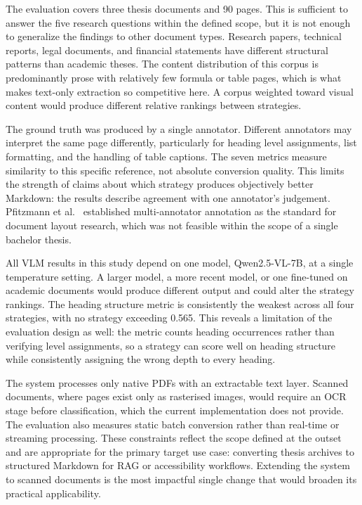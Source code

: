 The evaluation covers three thesis documents and 90 pages. This is sufficient to
answer the five research questions within the defined scope, but it is not enough
to generalize the findings to other document types. Research papers, technical
reports, legal documents, and financial statements have different structural
patterns than academic theses. The content distribution of this corpus is
predominantly prose with relatively few formula or table pages, which is what
makes text-only extraction so competitive here. A corpus weighted toward visual
content would produce different relative rankings between strategies.

The ground truth was produced by a single annotator. Different annotators may
interpret the same page differently, particularly for heading level assignments,
list formatting, and the handling of table captions. The seven metrics measure
similarity to this specific reference, not absolute conversion quality. This
limits the strength of claims about which strategy produces objectively better
Markdown: the results describe agreement with one annotator's judgement.
Pfitzmann et al.\ \autocite{pfitzmann2022} established multi-annotator annotation
as the standard for document layout research, which was not feasible within the
scope of a single bachelor thesis.

All VLM results in this study depend on one model, Qwen2.5-VL-7B, at a single
temperature setting. A larger model, a more recent model, or one fine-tuned on
academic documents would produce different output and could alter the strategy
rankings. The heading structure metric is consistently the weakest across all four
strategies, with no strategy exceeding 0.565. This reveals a limitation of the
evaluation design as well: the metric counts heading occurrences rather than
verifying level assignments, so a strategy can score well on heading structure
while consistently assigning the wrong depth to every heading.

The system processes only native PDFs with an extractable text layer. Scanned
documents, where pages exist only as rasterised images, would require an OCR
stage before classification, which the current implementation does not provide.
The evaluation also measures static batch conversion rather than real-time or
streaming processing. These constraints reflect the scope defined at the outset
and are appropriate for the primary target use case: converting thesis archives to
structured Markdown for RAG or accessibility workflows. Extending the system to
scanned documents is the most impactful single change that would broaden its
practical applicability.

